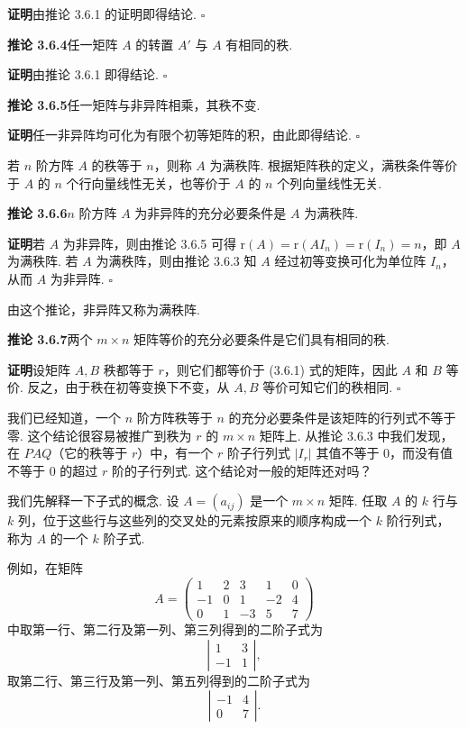 \documentclass[UTF8, 12pt, fontset=fandol, oneside]{ctexart}
\begin{document}
\noindent\textbf{证明}\quad 由推论 3.6.1 的证明即得结论. $\square$

\noindent\textbf{推论 3.6.4}\quad 任一矩阵 $A$ 的转置 $A'$ 与 $A$ 有相同的秩.

\noindent\textbf{证明}\quad 由推论 3.6.1 即得结论. $\square$

\noindent\textbf{推论 3.6.5}\quad 任一矩阵与非异阵相乘，其秩不变.

\noindent\textbf{证明}\quad 任一非异阵均可化为有限个初等矩阵的积，由此即得结论. $\square$

若 $n$ 阶方阵 $A$ 的秩等于 $n$，则称 $A$ 为满秩阵. 根据矩阵秩的定义，满秩条件等价于 $A$ 的 $n$ 个行向量线性无关，也等价于 $A$ 的 $n$ 个列向量线性无关.

\noindent\textbf{推论 3.6.6}\quad $n$ 阶方阵 $A$ 为非异阵的充分必要条件是 $A$ 为满秩阵.

\noindent\textbf{证明}\quad 若 $A$ 为非异阵，则由推论 3.6.5 可得 $\mathrm{r}(A)=\mathrm{r}(AI_n)=\mathrm{r}(I_n)=n$，即 $A$ 为满秩阵. 若 $A$ 为满秩阵，则由推论 3.6.3 知 $A$ 经过初等变换可化为单位阵 $I_n$，从而 $A$ 为非异阵. $\square$

由这个推论，非异阵又称为满秩阵.

\noindent\textbf{推论 3.6.7}\quad 两个 $m\times n$ 矩阵等价的充分必要条件是它们具有相同的秩.

\noindent\textbf{证明}\quad 设矩阵 $A,B$ 秩都等于 $r$，则它们都等价于 (3.6.1) 式的矩阵，因此 $A$ 和 $B$ 等价. 反之，由于秩在初等变换下不变，从 $A,B$ 等价可知它们的秩相同. $\square$

我们已经知道，一个 $n$ 阶方阵秩等于 $n$ 的充分必要条件是该矩阵的行列式不等于零. 这个结论很容易被推广到秩为 $r$ 的 $m\times n$ 矩阵上. 从推论 3.6.3 中我们发现，在 $PAQ$（它的秩等于 $r$）中，有一个 $r$ 阶子行列式 $|I_r|$ 其值不等于 0，而没有值不等于 0 的超过 $r$ 阶的子行列式. 这个结论对一般的矩阵还对吗？

我们先解释一下子式的概念. 设 $A=(a_{ij})$ 是一个 $m\times n$ 矩阵. 任取 $A$ 的 $k$ 行与 $k$ 列，位于这些行与这些列的交叉处的元素按原来的顺序构成一个 $k$ 阶行列式，称为 $A$ 的一个 $k$ 阶子式.

例如，在矩阵
\[
A=\left(\begin{array}{rrrrr}
1&2&3&1&0\\
-1&0&1&-2&4\\
0&1&-3&5&7
\end{array}\right)
\]
中取第一行、第二行及第一列、第三列得到的二阶子式为
\[
\left|\begin{array}{rr}
1&3\\
-1&1
\end{array}\right|,
\]
取第二行、第三行及第一列、第五列得到的二阶子式为
\[
\left|\begin{array}{rr}
-1&4\\
0&7
\end{array}\right|.
\]
\end{document}
